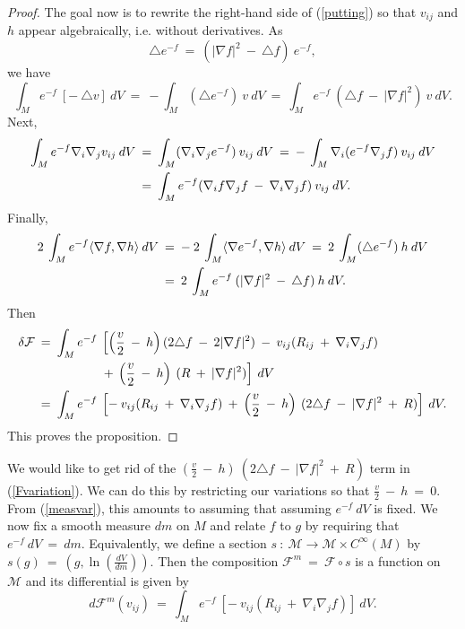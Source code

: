 \documentclass[12pt]{amsart}
\numberwithin{equation}{section}
\theoremstyle{plain}
\theoremstyle{definition}
\theoremstyle{remark}
\begin{document}
\begin{proof}
The goal now is to rewrite the right-hand side of
(\ref{putting}) so that $v_{ij}$ and $h$ appear
algebraically, i.e. without derivatives.
As 
\begin{equation} \label{id}
\triangle e^{-f} \: = \: (|\nabla f|^2 \: - \: \triangle f) \: e^{-f},
\end{equation}
we have
\begin{equation}
\int_M e^{-f} \: [ - \: \triangle v ] \: dV \: = \:
- \int_M (\triangle e^{-f} )\: v \: dV \: = \:
\int_M e^{-f} \: (\triangle f \: - \: |\nabla f|^2 ) \: v \: dV.
\end{equation}
Next,
\begin{align}
\int_M e^{-f} \nabla_i \nabla_j v_{ij} \: dV \: & = \:
\int_M (\nabla_i \nabla_j e^{-f}) \: v_{ij} \: dV \: = \:
- \: \int_M \nabla_i ( e^{-f} \nabla_j f) \: v_{ij} \: dV \\
& = \:
\int_M e^{-f} (\nabla_i f \nabla_j f \: - \: \nabla_i \nabla_j f) 
\: v_{ij} \: dV. \notag
\end{align}
Finally,
\begin{align}
2 \: \int_M e^{-f} \langle \nabla f, \nabla h \rangle \: dV \: & = \:
- \: 2 \: \int_M  \langle \nabla e^{-f}, \nabla h \rangle \: dV \: = \:
2 \: \int_M  (\triangle e^{-f}) \: h \: dV \\
& = \:
2 \: \int_M e^{-f} \:
(|\nabla f|^2 \: - \: \triangle f) \: h \: dV. \notag
\end{align}
Then 
\begin{align} \label{Fvariation}
\delta {\mathcal F} \: = \:
\int_M e^{-f} \: & \left[ 
\left( \frac{v}{2} \: - \: h \right) (2 \triangle f \: - \:
2 |\nabla f|^2 ) \: - \: v_{ij} (R_{ij} \: + \: \nabla_i \nabla_j f)
\right. \\
& 
\left.  + \: \left( \frac{v}{2} \: - \: h \right) \: 
(R \: + \: |\nabla f|^2 )
\right] \: dV \notag \\
=  \: \int_M e^{-f} \: & \left[ - \: v_{ij} 
(R_{ij} \: + \: \nabla_i \nabla_j f) \: + \: 
\left( \frac{v}{2} \: - \: h \right) \: (2 \triangle f \: - \:
|\nabla f|^2 \: + \: R) \right] \: dV. \notag
\end{align}
This proves the proposition.
\end{proof}

We would like to get rid of the $\left( \frac{v}{2} \: - \: h \right) \: (2 \triangle f \: - \:
|\nabla f|^2 \: + \: R)$ term in (\ref{Fvariation}).  We can do this by restricting
our variations so that $\frac{v}{2} \: - \: h \: = \: 0$. From
(\ref{measvar}), this amounts to assuming that assuming $e^{-f} \: dV$ is fixed.
We now fix a smooth measure $dm$ on $M$ and relate $f$ to $g$ by
requiring that $e^{-f} \: dV \: = \: dm$. Equivalently, we define
a section $s \: : \: {\mathcal M} \rightarrow {\mathcal M} \times C^\infty(M)$
by $s(g) \: = \: \left( g, \ln \left( \frac{dV}{dm}\right) \right)$.
Then the composition ${\mathcal F}^m \: = \: 
{\mathcal F}\circ s$ is a function on ${\mathcal M}$ and its differential
is given by 
\begin{equation}
d{\mathcal F}^m (v_{ij}) \: = \: \int_M e^{-f} \: \left[ - \: v_{ij} 
(R_{ij} \: + \: \nabla_i \nabla_j f) \right] \: dV.
\end{equation}
\end{document}
